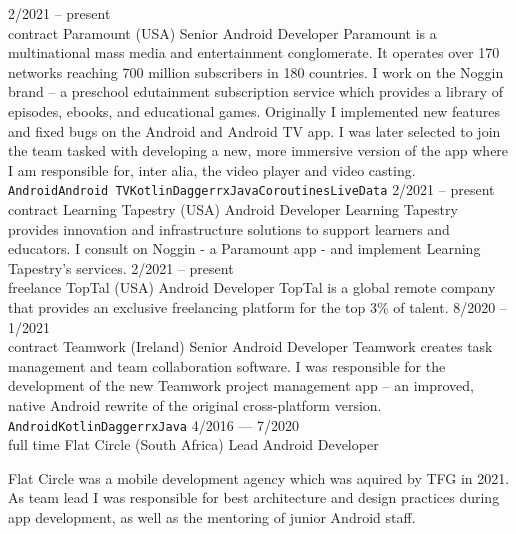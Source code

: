 \documentclass[9pt]{developercv} %
\begin{document}
\begin{entrylist}
	\entry
		{2/2021 -- present\\\footnotesize{contract}}
		{Paramount {\normalfont\small (USA)}}
		{Senior Android Developer}
		{Paramount is a multinational mass media and entertainment conglomerate. It operates over 170 networks reaching 700 million subscribers in 180 countries. I work on the Noggin brand -- a preschool edutainment subscription service which provides a library of episodes, ebooks, and educational games. Originally I implemented new features and fixed bugs on the Android and Android TV app. I was later selected to join the team tasked with developing a new, more immersive version of the app where I am responsible for, inter alia, the video player and video casting. \\ \texttt{Android}\slashsep\texttt{Android TV}\slashsep\texttt{Kotlin}\slashsep\texttt{Dagger}\slashsep\texttt{rxJava}\slashsep\texttt{Coroutines}\slashsep\texttt{LiveData}}
	\entry
		{2/2021 -- present\\\footnotesize{contract}}
		{Learning Tapestry {\normalfont\small (USA)}}
		{Android Developer}
		{Learning Tapestry provides innovation and infrastructure solutions to support learners and educators. I consult on Noggin - a Paramount app - and implement Learning Tapestry's services.}
	\entry
		{2/2021 -- present\\\footnotesize{freelance}}
		{TopTal {\normalfont\small (USA)}}
		{Android Developer}
		{TopTal is a global remote company that provides an exclusive freelancing platform for the top 3\% of talent.}
	\entry
		{8/2020 -- 1/2021\\\footnotesize{contract}}
		{Teamwork {\normalfont\small (Ireland)}}
		{Senior Android Developer}
		{Teamwork creates task management and team collaboration software. I was responsible for the development of the new Teamwork project management app -- an improved, native Android rewrite of the original cross-platform version.\\ \texttt{Android}\slashsep\texttt{Kotlin}\slashsep\texttt{Dagger}\slashsep\texttt{rxJava}}
	\entry
		{4/2016 --- 7/2020\\\footnotesize{full time}}
		{Flat Circle {\normalfont\small (South Africa)}}
		{Lead Android Developer}
		{Flat Circle was a mobile development agency which was aquired by TFG in 2021. As team lead I was responsible for best architecture and design practices during app development, as well as the mentoring of junior Android staff.\vspace{5pt}
		
}
\end{entrylist}
\end{document}
